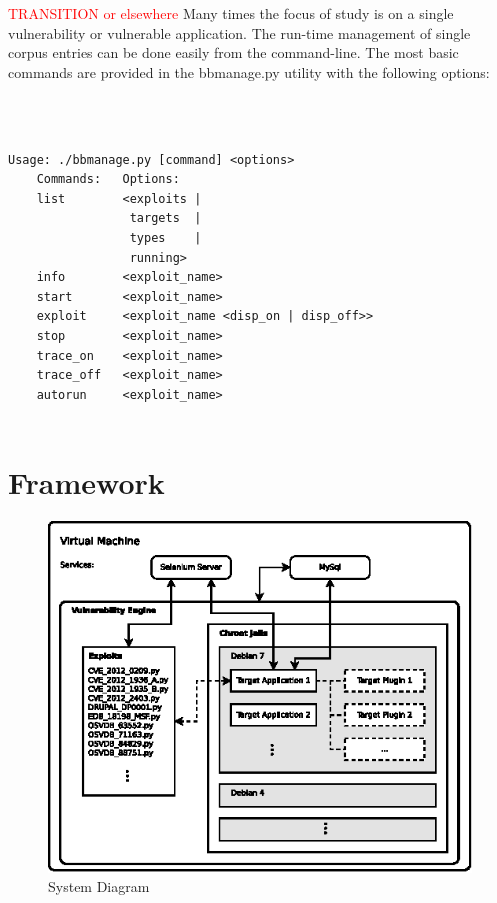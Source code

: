 \documentclass[letterpaper,twocolumn,10pt]{article}
\begin{document}
\textcolor{red}{ TRANSITION or elsewhere }
Many times the focus of study is on a single vulnerability or vulnerable application. The run-time management of single corpus entries can be done easily from the command-line. The most basic commands are provided in the bbmanage.py utility with the following options: 

{\tt \footnotesize
\begin{verbatim}

Usage: ./bbmanage.py [command] <options>
    Commands:   Options:
    list        <exploits | 
                 targets  | 
                 types    | 
                 running>
    info        <exploit_name>
    start       <exploit_name>
    exploit     <exploit_name <disp_on | disp_off>>
    stop        <exploit_name>
    trace_on    <exploit_name>
    trace_off   <exploit_name>
    autorun     <exploit_name>


\end{verbatim}
}



\section{Framework}

\begin{figure}[!tp]
\begin{center}
\includegraphics[scale=1.17]{system_diagram.eps}
\end{center}
\caption{System Diagram}
\end{figure}
\end{document}
